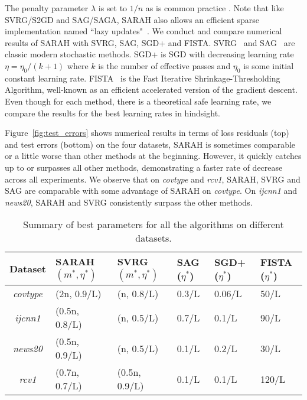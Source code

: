 \documentclass{article}
\begin{document}
 The penalty parameter $\lambda$ is set to $1/n$ as is common practice \cite{SAG}. Note that like SVRG/S2GD and SAG/SAGA, SARAH also allows an efficient sparse implementation named ``lazy updates"~\cite{konecny2015mini}.
We conduct and compare numerical results of SARAH with SVRG, SAG, SGD+ and FISTA. SVRG~\cite{SVRG} and SAG~\cite{SAG} are classic modern stochastic methods. SGD+ is SGD with decreasing learning rate $\eta=\eta_0/(k+1)$ where $k$ is the number of effective passes and $\eta_0$ is some initial constant learning rate. FISTA~\cite{fista} is the Fast Iterative Shrinkage-Thresholding Algorithm, well-known as an efficient accelerated version of the gradient descent. Even though for each method, there is a theoretical safe learning rate, we compare the results for the best learning rates in hindsight. 



Figure~\ref{fig:test_errors} shows numerical results in terms of loss residuals (top) and test errors (bottom) on the four datasets, SARAH is sometimes comparable or a little worse than other methods at the beginning. However, it quickly catches up to or surpasses all other methods, demonstrating a faster rate of decrease across all experiments. We observe that  on \emph{covtype} and \emph{rcv1}, SARAH, SVRG and SAG are comparable with some advantage of SARAH on  \emph{covtype}. On \emph{ijcnn1} and \emph{news20}, SARAH and SVRG consistently surpass the other methods. 

\begin{table} 
\scriptsize
\centering
\caption{Summary of best parameters for all the algorithms on different datasets.}
\label{table:stats}
\begin{tabular}{|c|C{1.25cm}|C{1.25cm}|C{0.7cm}|C{0.7cm}|C{0.7cm}|}
\hline
Dataset  & SARAH $(m^*,\eta^*)$ & SVRG $(m^*,\eta^*)$ & SAG ($\eta^*$)  & SGD+ ($\eta^*$)   & FISTA ($\eta^*$) \\
\hline \hline 
\emph{covtype} & (2n, 0.9/L)&  (n, 0.8/L) & 0.3/L & 0.06/L & 50/L\\ %
\hline 
\emph{ijcnn1} & (0.5n, 0.8/L)  & (n, 0.5/L) & 0.7/L & 0.1/L & 90/L \\%
\hline
\emph{news20} & (0.5n, 0.9/L)  & (n, 0.5/L) & 0.1/L & 0.2/L & 30/L \\%
\hline
\emph{rcv1} & (0.7n, 0.7/L) & (0.5n, 0.9/L) & 0.1/L & 0.1/L & 120/L \\ %
\hline 
\end{tabular}
\end{table}
\end{document}
